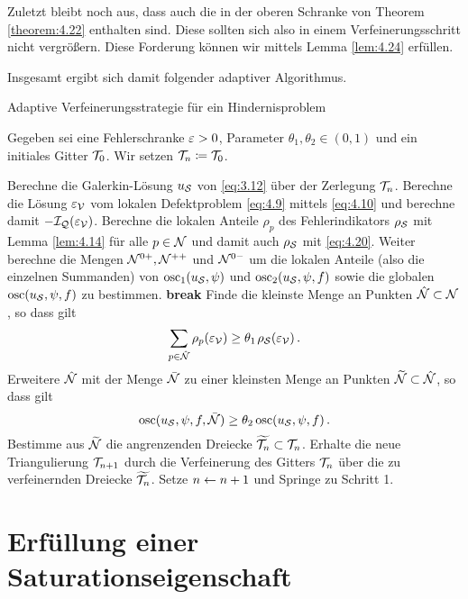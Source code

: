 Zuletzt bleibt noch aus, dass auch die  in der oberen Schranke von Theorem \ref{theorem:4.22} enthalten sind. Diese sollten sich also in einem Verfeinerungsschritt nicht vergrößern. Diese Forderung können wir mittels Lemma \ref{lem:4.24} erfüllen.

Insgesamt ergibt sich damit folgender adaptiver Algorithmus.


\begin{algorithm}[H]
\caption{Adaptive Verfeinerungsstrategie für ein Hindernisproblem\label{alg:4.1}}
Gegeben sei eine Fehlerschranke $\varepsilon>0$, Parameter $\theta_1,\theta_2 \in (0,1)$ und ein initiales Gitter $\mathcal T_0$. Wir setzen $\mathcal T_n \coloneqq \mathcal T_0$.
\begin{algorithmic}[1] 
\State Berechne die Galerkin-Lösung $u_{\mathcal S}$ von \eqref{eq:3.12} über der Zerlegung $\mathcal T_n$.
\State Berechne die Lösung $\varepsilon_{\mathcal V}$ vom lokalen Defektproblem \eqref{eq:4.9} mittels \eqref{eq:4.10} und berechne damit $-\mathcal I_{\mathcal Q}(\varepsilon_{\mathcal V})$.
\State Berechne die lokalen Anteile $\rho_p$ des Fehlerindikators $\rho_{\mathcal S}$ mit Lemma \ref{lem:4.14} für alle $p \in \mathcal N$ und damit auch $\rho_{\mathcal S}$ mit \eqref{eq:4.20}. 
\State Weiter berechne die Mengen $\mathcal N^{0+},\mathcal N^{++}$ und $\mathcal N^{0-}$ um die lokalen Anteile (also die einzelnen Summanden) von $\operatorname{osc}_1(u_{\mathcal S},\psi)$ und $\operatorname{osc}_2(u_{\mathcal S},\psi,f)$ sowie die globalen  $\operatorname{osc} (u_{\mathcal S},\psi,f)$ zu bestimmen.
\State \textbf{break} 
\EndIf 
\State Finde die kleinste Menge an Punkten $\hat{\mathcal N}\subset \mathcal N$, so dass gilt
\[
	\sum_{p \in \hat{\mathcal N}} \rho_p (\varepsilon_{\mathcal V}) \ge \theta_1\;\! \rho_{\mathcal S}(\varepsilon_{\mathcal V}) \,.
\]
\State Erweitere $\hat{\mathcal N}$ mit der Menge $\bar{\mathcal N}$ zu einer kleinsten Menge an Punkten $\widetilde{\mathcal N} \subset \hat{\mathcal N}$, so dass gilt
\[
	\operatorname{osc} (u_{\mathcal S},\psi,f,\bar{\mathcal N}) \ge \theta_2 \operatorname{osc} (u_{\mathcal S},\psi,f) \, .
\]
\State Bestimme aus $\widetilde{\mathcal N}$ die angrenzenden Dreiecke $\widetilde{\mathcal T_n} \subset \mathcal T_n$. 
\State Erhalte die neue Triangulierung $\mathcal T_{n+1}$ durch die Verfeinerung des Gitters $\mathcal T_n$ über die zu verfeinernden Dreiecke $\widetilde{\mathcal T_n}$.
\State Setze $n \leftarrow n+1$ und Springe zu Schritt 1.
\end{algorithmic}
\end{algorithm}




\section{Erfüllung einer Saturationseigenschaft}
\label{kap:4.3}

